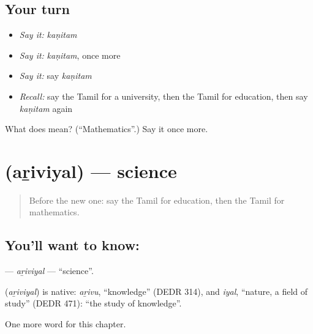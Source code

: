 \subsection*{Your turn}
\begin{itemize}
\raggedright
  \item \emph{Say it:} \emph{kaṇitam}
  \item \emph{Say it:} \emph{kaṇitam}, once more
  \item \emph{Say it:} say \emph{kaṇitam}
  \item \emph{Recall:} say the Tamil for a university, then the Tamil for education, then say \emph{kaṇitam} again
\end{itemize}

\begin{tcolorbox}[breakable,colback=teal!4,colframe=teal!35!black,title={Before you move on}]
What does  mean? (\textquotedblleft{}Mathematics\textquotedblright{}.) Say it once more.
\end{tcolorbox}
\section[\texorpdfstring{\ta{அறிவியல்} (aṟiviyal)}{அறிவியல் (aṟiviyal)}]{ (aṟiviyal) — science}

\label{lesson:TA-C252-ariviyal}



\begin{quote}
Before the new one: say the Tamil for education, then the Tamil for mathematics.
\end{quote}

\subsection*{You'll want to know: }
\textbf{} — \emph{aṟiviyal} — \textquotedblleft{}science\textquotedblright{}.

\begin{cousinweb}
\textbf{} (\emph{aṟiviyal}) is native: \emph{aṟivu}, \textquotedblleft{}knowledge\textquotedblright{} (DEDR 314), and \emph{iyal}, \textquotedblleft{}nature, a field of study\textquotedblright{} (DEDR 471): \textquotedblleft{}the study of knowledge\textquotedblright{}.
\end{cousinweb}

\begin{grammarlens}[title={What you've built}]
One more word for this chapter.
\end{grammarlens}

